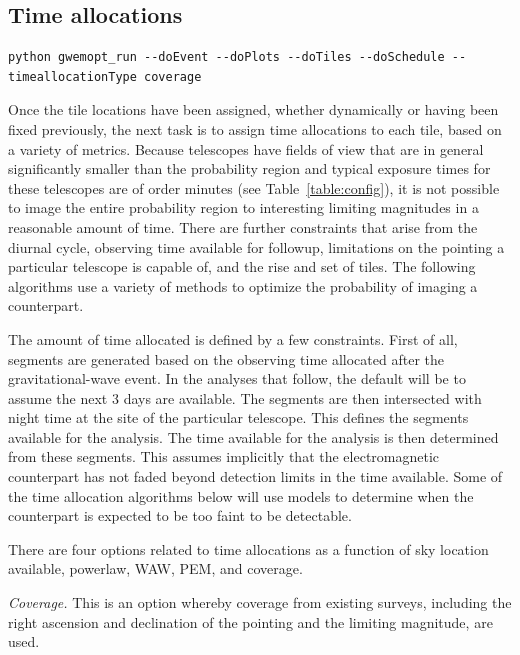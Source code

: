 \documentclass[twocolumn]{aastex61}
\begin{document}
\subsection{Time allocations}
\begin{lstlisting}
python gwemopt_run --doEvent --doPlots --doTiles --doSchedule --timeallocationType coverage
\end{lstlisting}
Once the tile locations have been assigned, whether dynamically or having been fixed previously, the next task is to assign time allocations to each tile, based on a variety of metrics. 
Because telescopes have fields of view that are in general significantly smaller than the probability region and typical exposure times for these telescopes are of order minutes (see Table~\ref{table:config}), it is not possible to image the entire probability region to interesting limiting magnitudes in a reasonable amount of time.
There are further constraints that arise from the diurnal cycle, observing time available for followup, limitations on the pointing a particular telescope is capable of, and the rise and set of tiles.
The following algorithms use a variety of methods to optimize the probability of imaging a counterpart.

The amount of time allocated is defined by a few constraints. 
First of all, segments are generated based on the observing time allocated after the gravitational-wave event. In the analyses that follow, the default will be to assume the next 3 days are available.
The segments are then intersected with night time at the site of the particular telescope.
This defines the segments available for the analysis.
The time available for the analysis is then determined from these segments.
This assumes implicitly that the electromagnetic counterpart has not faded beyond detection limits in the time available. Some of the time allocation algorithms below will use models to determine when the counterpart is expected to be too faint to be detectable.

There are four options related to time allocations as a function of sky location available, powerlaw, WAW, PEM, and coverage.

\emph{Coverage.} This is an option whereby coverage from existing surveys, including the right ascension and declination of the pointing and the limiting magnitude, are used.
\end{document}
